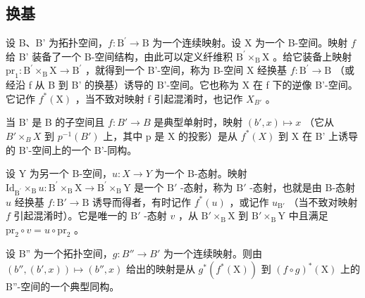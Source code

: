 \subsection{换基}

设 B、B' 为拓扑空间，\(f\colon\mathrm{B}^{\prime}\to\mathrm{B}\) 为一个连续映射。设 X 为一个 B-空间。映射 \(f\) 给 B' 装备了一个 B-空间结构，由此可以定义纤维积 \(\mathrm{B}^{\prime}\times_{\mathrm{B}}\mathrm{X}\) 。给它装备上映射 \(\mathrm{pr}_{1}\colon\mathrm{B}^{\prime}\times_{\mathrm{B}}\mathrm{X}\to\mathrm{B}^{\prime}\) ，就得到一个 B'-空间，称为 B-空间 X 经换基 \(f\colon\mathrm{B}^{\prime}\to\mathrm{B}\) （或经沿 f 从 B 到 B' 的换基）诱导的 B'-空间。它也称为 X 在 f 下的逆像 B'-空间。它记作 \(f^{*}(\mathrm{X})\) ，当不致对映射 f 引起混淆时，也记作 \(X_{B'}\) 。

当 B' 是 B 的子空间且 \(f: B' \to B\) 是典型单射时，映射 \((b', x) \mapsto x\) （它从 \(B' \times_{B} X\) 到 \(p^{-1}(B')\) 上，其中 p 是 X 的投影）是从 \(f^{*}(X)\) 到 X 在 B' 上诱导的 B'-空间上的一个 B'-同构。

设 Y 为另一个 B-空间，\(u\colon X\to Y\) 为一个 B-态射。映射 \(\mathrm{Id}_{\mathrm{B}^{\prime}}\times_{\mathrm{B}}u\colon \mathrm{B}^{\prime}\times_{\mathrm{B}}\mathrm{X}\to \mathrm{B}^{\prime}\times_{\mathrm{B}}\mathrm{Y}\) 是一个 \(\mathrm{B}'\) -态射，称为 \(\mathrm{B}'\) -态射，也就是由 B-态射 \(u\) 经换基 \(f\colon \mathrm{B}'\to \mathrm{B}\) 诱导而得者，有时记作 \(f^{*}(u)\) ，或记作 \(u_{\mathrm{B}'}\) （当不致对映射 \(f\) 引起混淆时）。它是唯一的 \(\mathrm{B}'\) -态射 \(v\) ，从 \(\mathrm{B}'\times_{\mathrm{B}}\mathrm{X}\) 到 \(\mathrm{B}'\times_{\mathrm{B}}\mathrm{Y}\) 中且满足 \(\mathrm{pr}_2\circ v = u\circ \mathrm{pr}_2\) 。

设 B'' 为一个拓扑空间，\(g: B'' \to B'\) 为一个连续映射。则由 \((b'', (b', x)) \mapsto (b'', x)\) 给出的映射是从 \(g^{*}(f^{*}(\mathrm{X}))\) 到 \((f \circ g)^{*}(\mathrm{X})\) 上的 B''-空间的一个典型同构。

